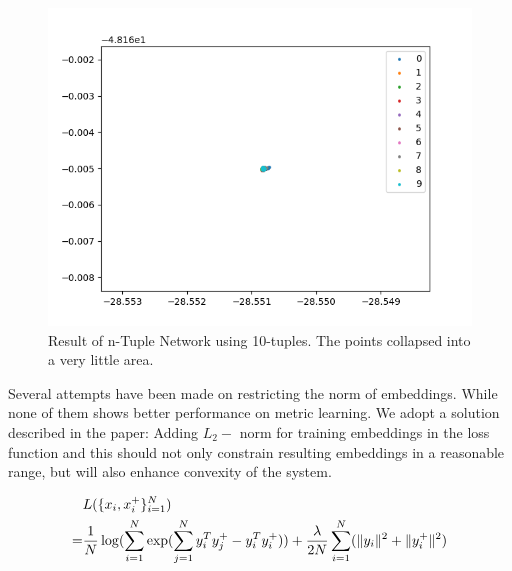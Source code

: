 \documentclass[10pt,twocolumn,letterpaper]{article}
\begin{document}
				\begin{figure}[htbp]
					\begin{center}
						\includegraphics[width=0.9\linewidth]{fail_tuple}
					\end{center}
					\caption{Result of n-Tuple Network using 10-tuples. The points collapsed into a very little area.\label{fig:fail_tuple}}
				\end{figure}
			
			Several attempts have been made on restricting the norm of embeddings. While none of them shows better performance on metric learning. We adopt a solution described in the paper: Adding $L_2-$ norm for training embeddings in the loss function and this should not only constrain resulting embeddings in a reasonable range, but will also enhance convexity of the system.
			
			\begin{align}
			&L(\{x_i,x_i^+\}^N_{i=1})\notag\\
			=&\frac{1}{N}\log(\sum_{i=1}^N\exp(\sum_{j=1}^Ny^T_iy_j^+-y_i^Ty_i^+))+ \frac{\lambda}{2N} \sum_{i=1}^N(\lVert y_i\rVert^2+ \lVert y^+_i\rVert^2)
			\end{align}
			
\end{document}
